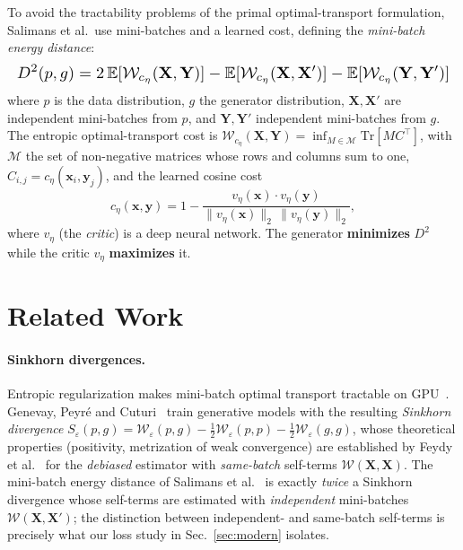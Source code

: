 \documentclass[10pt,twocolumn]{article}
\begin{document}
To avoid the tractability problems of the primal optimal-transport formulation, Salimans
et al.\ use mini-batches and a learned cost, defining the \emph{mini-batch energy
distance}:
\[
\resizebox{\columnwidth}{!}{$\displaystyle
D^2(p,g) = 2\,\mathbb{E}[\mathcal{W}_{c_\eta}(\mathbf{X},\mathbf{Y})]
- \mathbb{E}[\mathcal{W}_{c_\eta}(\mathbf{X},\mathbf{X}')]
- \mathbb{E}[\mathcal{W}_{c_\eta}(\mathbf{Y},\mathbf{Y}')]
$}
\]
where $p$ is the data distribution, $g$ the generator distribution,
$\mathbf{X},\mathbf{X}'$ are independent mini-batches from $p$, and
$\mathbf{Y},\mathbf{Y}'$ independent mini-batches from $g$. The entropic optimal-transport
cost is $\mathcal{W}_{c_\eta}(\mathbf{X},\mathbf{Y}) = \inf_{M\in\mathcal{M}} \mathrm{Tr}[M C^\top]$,
with $\mathcal{M}$ the set of non-negative matrices whose rows and columns sum to one,
$C_{i,j}=c_\eta(\mathbf{x}_i,\mathbf{y}_j)$, and the learned cosine cost
\begin{equation}
c_\eta(\mathbf{x},\mathbf{y}) = 1 - \frac{v_\eta(\mathbf{x})\cdot v_\eta(\mathbf{y})}
{\lVert v_\eta(\mathbf{x})\rVert_2\,\lVert v_\eta(\mathbf{y})\rVert_2},
\nonumber
\end{equation}
where $v_\eta$ (the \emph{critic}) is a deep neural network. The generator
\textbf{minimizes} $D^2$ while the critic $v_\eta$ \textbf{maximizes} it.

\section{Related Work}
\paragraph{Sinkhorn divergences.} Entropic regularization makes mini-batch optimal
transport tractable on GPU~\cite{cuturi2013}. Genevay, Peyr\'e and
Cuturi~\cite{genevay2018} train generative models with the resulting \emph{Sinkhorn
divergence} $S_\varepsilon(p,g) = \mathcal{W}_\varepsilon(p,g) - \tfrac12
\mathcal{W}_\varepsilon(p,p) - \tfrac12 \mathcal{W}_\varepsilon(g,g)$, whose theoretical
properties (positivity, metrization of weak convergence) are established by Feydy et
al.~\cite{feydy2019} for the \emph{debiased} estimator with \emph{same-batch} self-terms
$\mathcal{W}(\mathbf{X},\mathbf{X})$. The mini-batch energy distance of Salimans et
al.~\cite{salimans2018} is exactly \emph{twice} a Sinkhorn divergence whose self-terms
are estimated with \emph{independent} mini-batches $\mathcal{W}(\mathbf{X},\mathbf{X}')$;
the distinction between independent- and same-batch self-terms is precisely what our loss
study in Sec.~\ref{sec:modern} isolates.
\end{document}
